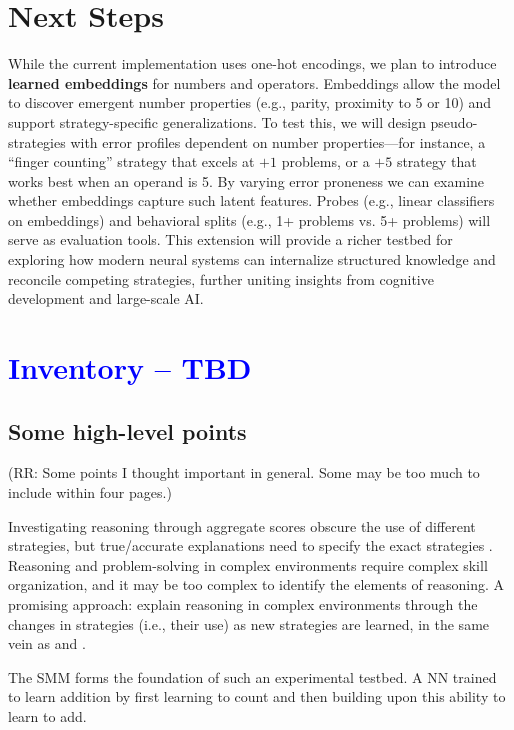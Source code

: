 \documentclass{article}
\newcommand{\rrsuggestion}[1]{\textcolor{blue}{#1}}
\begin{document}
\section{Next Steps}
While the current implementation uses one-hot encodings, we plan to introduce \textbf{learned embeddings} for numbers and operators. Embeddings allow the model to discover emergent number properties (e.g., parity, proximity to 5 or 10) and support strategy-specific generalizations. To test this, we will design pseudo-strategies with error profiles dependent on number properties---for instance, a ``finger counting'' strategy that excels at $+1$ problems, or a $+5$ strategy that works best when an operand is 5. By varying error proneness we can examine whether embeddings capture such latent features. Probes (e.g., linear classifiers on embeddings) and behavioral splits (e.g., 1+ problems vs. 5+ problems) will serve as evaluation tools. This extension will provide a richer testbed for exploring how modern neural systems can internalize structured knowledge and reconcile competing strategies, further uniting insights from cognitive development and large-scale AI.

\section*{\rrsuggestion{Inventory -- TBD}}

\subsection*{Some high-level points}

(RR: Some points I thought important in general. Some may be too much to include within four pages.)

Investigating reasoning through aggregate scores obscure the use of different strategies, but true/accurate explanations need to specify the exact strategies \citep{newell1958elements, simon1971human, simon1976substantive, siegler1987perils, shrager1998scads, gigerenzer2020explain}. Reasoning and problem-solving in complex environments require complex skill organization, and it may be too complex to identify the elements of reasoning. A promising approach: explain reasoning in complex environments through the changes in strategies (i.e., their use) as new strategies are learned, in the same vein as \citet{siegler1984strategychoices} and \citet{shrager1998scads}.

The SMM forms the foundation of such an experimental testbed. A NN trained to learn addition by first learning to count and then building upon this ability to learn to add.
\end{document}
